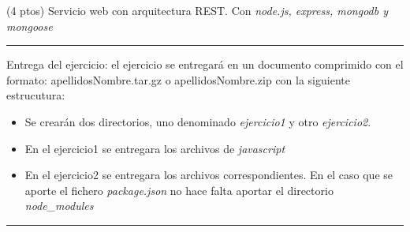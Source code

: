 \documentclass[addpoints,12pt]{exam}
\begin{document}
\begin{questions}
\newpage

\question(4 ptos) Servicio web con arquitectura REST. Con \emph{node.js, express, mongodb y mongoose}
\end{questions}
\vspace{0,5cm}
\hrule
\vspace{0,5cm}
Entrega del ejercicio: el ejercicio se entregará en un documento comprimido con el formato: apellidosNombre.tar.gz o apellidosNombre.zip con la siguiente estrucutura:
\begin{itemize}
\item Se crearán dos directorios, uno denominado \emph{ejercicio1} y otro \emph{ejercicio2}.
\item En el ejercicio1 se entregara los archivos de \emph{javascript}
\item En el ejercicio2 se entregara los archivos correspondientes. En el caso que se aporte el fichero \emph{package.json} no hace falta aportar el directorio \emph{node\_modules}
\end{itemize}
\vspace{0,5cm}
\hrule
\vspace{0,5cm}
\end{document}
